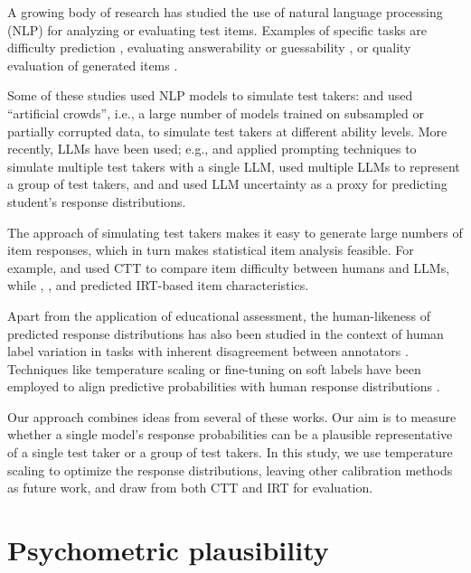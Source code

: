 \documentclass[11pt]{article}
\begin{document}
A growing body of research has studied the use of natural language processing (NLP) for analyzing or evaluating test items. Examples of specific tasks are difficulty prediction \citep{Yaneva2024}, evaluating answerability or guessability \citep{Raina2023,Saeuberli2024}, or quality evaluation of generated items \citep{Raina2022,Gorgun2024}.

Some of these studies used NLP models to simulate test takers: \citet{Lalor2019} and \citet{Byrd2022} used ``artificial crowds'', i.e., a large number of models trained on subsampled or partially corrupted data, to simulate test takers at different ability levels. More recently, LLMs have been used; e.g., \citet{Lu2024} and \citet{Hayakawa2024} applied prompting techniques to simulate multiple test takers with a single LLM, \citet{Park2024} used multiple LLMs to represent a group of test takers, and \citet{Liusie2023} and \citet{Zotos2025} used LLM uncertainty as a proxy for predicting student's response distributions.

The approach of simulating test takers makes it easy to generate large numbers of item responses, which in turn makes statistical item analysis feasible. For example, \citet{Liusie2023} and \citet{Hayakawa2024} used CTT to compare item difficulty between humans and LLMs, while \citet{Lalor2019}, \citet{Byrd2022}, and \citet{Park2024} predicted IRT-based item characteristics.

Apart from the application of educational assessment, the human-likeness of predicted response distributions has also been studied in the context of human label variation in tasks with inherent disagreement between annotators \citep{Plank2022}. Techniques like temperature scaling or fine-tuning on soft labels have been employed to align predictive probabilities with human response distributions \citep{Baan2022,Chen2024}.

Our approach combines ideas from several of these works. Our aim is to measure whether a single model's response probabilities can be a plausible representative of a single test taker or a group of test takers. In this study, we use temperature scaling to optimize the response distributions, leaving other calibration methods as future work, and draw from both CTT and IRT for evaluation.


\section{Psychometric plausibility}
\label{sec:method}
\end{document}
